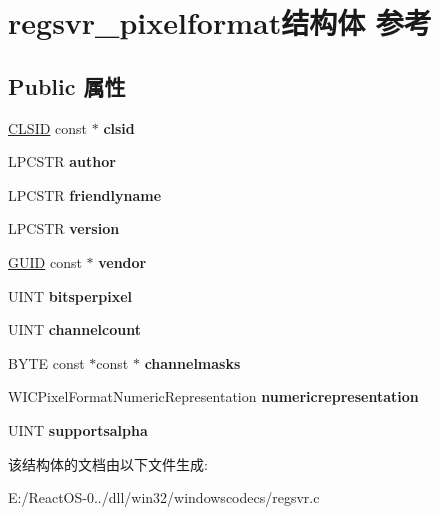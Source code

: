 \hypertarget{structregsvr__pixelformat}{}\section{regsvr\+\_\+pixelformat结构体 参考}
\label{structregsvr__pixelformat}
\subsection*{Public 属性}
\begin{DoxyCompactItemize}
\item 
\mbox{\label{structregsvr__pixelformat_aa43f0c12c875e23d2dbc2e4b81a88808}} 
\hyperlink{struct___i_i_d}{C\+L\+S\+ID} const  $\ast$ {\bfseries clsid}
\item 
\mbox{\label{structregsvr__pixelformat_a066730116c5e28b605d7be662654c0d9}} 
L\+P\+C\+S\+TR {\bfseries author}
\item 
\mbox{\label{structregsvr__pixelformat_a0508f37c01b41ef4334922f9fdddf489}} 
L\+P\+C\+S\+TR {\bfseries friendlyname}
\item 
\mbox{\label{structregsvr__pixelformat_aaff23d9fa9de810fd90659c82d324bbe}} 
L\+P\+C\+S\+TR {\bfseries version}
\item 
\mbox{\label{structregsvr__pixelformat_ab978a624cafe7a585b71821997f2019b}} 
\hyperlink{interface_g_u_i_d}{G\+U\+ID} const  $\ast$ {\bfseries vendor}
\item 
\mbox{\label{structregsvr__pixelformat_af8c56e301e4c3c12172b616f5a2a15fd}} 
U\+I\+NT {\bfseries bitsperpixel}
\item 
\mbox{\label{structregsvr__pixelformat_a9f0b9c5947438c21460527c11ade0e71}} 
U\+I\+NT {\bfseries channelcount}
\item 
\mbox{\label{structregsvr__pixelformat_a213928307efcb51cfef3fcb5138ca79a}} 
B\+Y\+TE const  $\ast$const  $\ast$ {\bfseries channelmasks}
\item 
\mbox{\label{structregsvr__pixelformat_aae87c98fb9ca87969c68b2c0668e08ff}} 
W\+I\+C\+Pixel\+Format\+Numeric\+Representation {\bfseries numericrepresentation}
\item 
\mbox{\label{structregsvr__pixelformat_a346f6826d483868076739c4562a8d204}} 
U\+I\+NT {\bfseries supportsalpha}
\end{DoxyCompactItemize}


该结构体的文档由以下文件生成\+:\begin{DoxyCompactItemize}
\item 
E\+:/\+React\+O\+S-\/0../dll/win32/windowscodecs/regsvr.\+c\end{DoxyCompactItemize}
